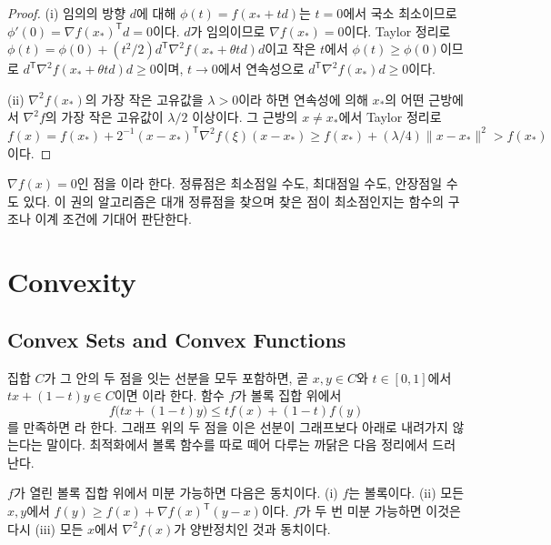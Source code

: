 \begin{proof}
(i) 임의의 방향 $d$에 대해 $\phi(t)=f(x_\ast+td)$는 $t=0$에서 국소 최소이므로 $\phi'(0)=\nabla f(x_\ast)^{\mathsf T}d=0$이다. $d$가 임의이므로 $\nabla f(x_\ast)=0$이다. Taylor 정리로 $\phi(t)=\phi(0)+(t^2/2)d^{\mathsf T}\nabla^2f(x_\ast+\theta td)d$이고 작은 $t$에서 $\phi(t)\ge\phi(0)$이므로 $d^{\mathsf T}\nabla^2f(x_\ast+\theta td)d\ge0$이며, $t\to0$에서 연속성으로 $d^{\mathsf T}\nabla^2f(x_\ast)d\ge0$이다.

(ii) $\nabla^2f(x_\ast)$의 가장 작은 고유값을 $\lambda>0$이라 하면 연속성에 의해 $x_\ast$의 어떤 근방에서 $\nabla^2f$의 가장 작은 고유값이 $\lambda/2$ 이상이다. 그 근방의 $x\ne x_\ast$에서 Taylor 정리로 $f(x)=f(x_\ast)+2^{-1}(x-x_\ast)^{\mathsf T}\nabla^2f(\xi)(x-x_\ast)\ge f(x_\ast)+(\lambda/4)\|x-x_\ast\|^2>f(x_\ast)$이다.
\end{proof}

$\nabla f(x)=0$인 점을 이라 한다. 정류점은 최소점일 수도, 최대점일 수도, 안장점일 수도 있다. 이 권의 알고리즘은 대개 정류점을 찾으며 찾은 점이 최소점인지는 함수의 구조나 이계 조건에 기대어 판단한다.

\section{Convexity}
\label{sec:convexity}

\subsection{Convex Sets and Convex Functions}

집합 $C$가 그 안의 두 점을 잇는 선분을 모두 포함하면, 곧 $x,y\in C$와 $t\in[0,1]$에서 $tx+(1-t)y\in C$이면 이라 한다. 함수 $f$가 볼록 집합 위에서
\[
f\bigl(tx+(1-t)y\bigr)\le tf(x)+(1-t)f(y)
\]
를 만족하면 라 한다. 그래프 위의 두 점을 이은 선분이 그래프보다 아래로 내려가지 않는다는 말이다. 최적화에서 볼록 함수를 따로 떼어 다루는 까닭은 다음 정리에서 드러난다\cite{boyd2004convex,rockafellar1970}.

\begin{theorem}
\label{thm:convex-characterization}
$f$가 열린 볼록 집합 위에서 미분 가능하면 다음은 동치이다. (i) $f$는 볼록이다. (ii) 모든 $x,y$에서 $f(y)\ge f(x)+\nabla f(x)^{\mathsf T}(y-x)$이다. $f$가 두 번 미분 가능하면 이것은 다시 (iii) 모든 $x$에서 $\nabla^2f(x)$가 양반정치인 것과 동치이다.
\end{theorem}

